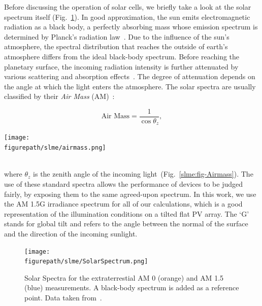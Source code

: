 \begin{refsection}
Before discussing the operation of solar cells, we briefly take a look at the 
solar spectrum itself (Fig.~\ref{slme:fig-solar}). In good approximation, the 
sun emits electromagnetic radiation as a black body, a perfectly absorbing 
mass whose emission spectrum is determined by Planck's radiation 
law~\cite{Planck1901}. Due to the influence of the sun's atmosphere, the 
spectral distribution that reaches the outside of earth's atmosphere differs 
from the ideal black-body spectrum. Before reaching the planetary surface, the 
incoming radiation intensity is further attenuated by various scattering and 
absorption effects~\cite{Bird1986}. The degree of attenuation depends on the 
angle at which the light enters the atmosphere. The solar spectra are usually 
classified by their \textit{Air Mass} (AM)~\cite{Green1981}: 
\begin{minipage}{1\textwidth} 
\begin{minipage}{0.4\textwidth} 
\begin{equation} 
\text{Air Mass} = \frac{1}{\cos \theta_z}, 
\end{equation} 
\end{minipage} 
\begin{minipage}{0.6\textwidth} 
\centering 
\texttt{[image: \\figurepath/slme/airmass.png]} 
\end{minipage} 
\end{minipage} 
\vspace{0.2in}\\ 
where $\theta_z$ is the zenith angle of the incoming 
light~(Fig.~\ref{slme:fig-Airmass}). The use of these standard spectra allows 
the performance of devices to be judged fairly, by exposing them to the same 
agreed-upon spectrum. In this work, we use the \gls{AM} 1.5G irradiance spectrum for 
all of our calculations, which is a good representation of the illumination conditions on a tilted flat \gls{PV} array. The `G' stands for global tilt and
refers to the angle between the normal of the surface and the direction of the 
incoming sunlight. 
 
\begin{figure}[ht]
\captionsetup{width=0.9\textwidth}
\centering 
\texttt{[image: \\figurepath/slme/SolarSpectrum.png]} 
\caption{\label{slme:fig-solar} Solar Spectra for the extraterrestial \gls{AM} 0 
(orange) and \gls{AM} 1.5 (blue) measurements. A black-body spectrum is added as a 
reference point. Data taken from~\cite{International2012}.} 
\end{figure} 
 

\end{refsection}
